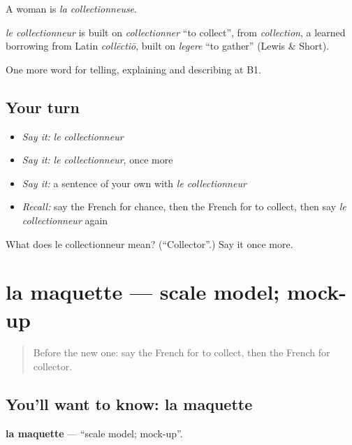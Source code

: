 A woman is \emph{la collectionneuse}.

\begin{cousinweb}
\emph{le collectionneur} is built on \emph{collectionner} \textquotedblleft{}to collect\textquotedblright{}, from \emph{collection}, a learned borrowing from Latin \emph{collēctiō}, built on \emph{legere} \textquotedblleft{}to gather\textquotedblright{} (Lewis \& Short).
\end{cousinweb}

\begin{grammarlens}[title={What you've built}]
One more word for telling, explaining and describing at B1.
\end{grammarlens}

\subsection*{Your turn}
\begin{itemize}
\raggedright
  \item \emph{Say it:} \emph{le collectionneur}
  \item \emph{Say it:} \emph{le collectionneur}, once more
  \item \emph{Say it:} a sentence of your own with \emph{le collectionneur}
  \item \emph{Recall:} say the French for chance, then the French for to collect, then say \emph{le collectionneur} again
\end{itemize}

\begin{tcolorbox}[breakable,colback=teal!4,colframe=teal!35!black,title={Before you move on}]
What does le collectionneur mean? (\textquotedblleft{}Collector\textquotedblright{}.) Say it once more.
\end{tcolorbox}
\section[la maquette]{la maquette — scale model; mock-up}

\label{lesson:FR-C501-maquette}



\begin{quote}
Before the new one: say the French for to collect, then the French for collector.
\end{quote}

\subsection*{You'll want to know: la maquette}
\textbf{la maquette} — \textquotedblleft{}scale model; mock-up\textquotedblright{}.

